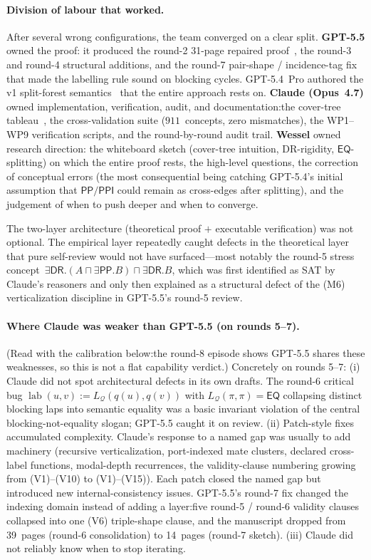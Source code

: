 \documentclass[
]{ceurart}
\theoremstyle{definition}
\newcommand{\DR}{\ensuremath{\mathsf{DR}}}
\newcommand{\EQ}{\ensuremath{\mathsf{EQ}}}
\newcommand{\PP}{\ensuremath{\mathsf{PP}}}
\newcommand{\PPI}{\ensuremath{\mathsf{PPI}}}
\newcommand{\Q}{\ensuremath{\mathcal Q}}
\newcommand{\lab}{\operatorname{lab}}
\begin{document}
\paragraph{Division of labour that worked.}
After several wrong configurations, the team converged on a clear
split.  \textbf{GPT-5.5} owned the proof: it produced the round-2
31-page repaired proof~\cite{GPT55Repaired}, the round-3 and
round-4 structural additions, and the round-7 pair-shape /
incidence-tag fix~\cite{GPT55Round7Sketch} that made the
labelling rule sound on blocking cycles.  GPT-5.4~Pro authored
the v1 split-forest semantics~\cite{SiblingCompleted} that the
entire approach rests on.  \textbf{Claude (Opus~4.7)} owned
implementation, verification, audit, and documentation:\@ the
cover-tree tableau~\cite{CoverTreeImpl}, the cross-validation
suite ($911$~concepts, zero mismatches), the WP1--WP9
verification scripts, and the round-by-round audit trail.
\textbf{Wessel} owned research direction: the whiteboard sketch
(cover-tree intuition, DR-rigidity, $\EQ$-splitting) on which the
entire proof rests, the high-level questions, the correction of
conceptual errors (the most consequential being catching
GPT-5.4's initial assumption that $\PP/\PPI$ could remain as
cross-edges after splitting), and the judgement of when to push
deeper and when to converge.

The two-layer architecture (theoretical proof $+$ executable
verification) was not optional.  The empirical layer repeatedly
caught defects in the theoretical layer that pure self-review
would not have surfaced---most notably the round-5 stress
concept~$\exists\DR.(A\sqcap\exists\PP.B)\sqcap\exists\DR.B$,
which was first identified as SAT by Claude's reasoners and only
then explained as a structural defect of the (M6) verticalization
discipline in GPT-5.5's round-5 review.

\paragraph{Where Claude was weaker than GPT-5.5 (on rounds 5--7).}
(Read with the calibration below:\@ the round-8 episode shows
GPT-5.5 shares these weaknesses, so this is not a flat capability
verdict.)  Concretely on rounds 5--7: (i) Claude did not spot
architectural defects in its own drafts.  The round-6 critical bug
$\lab(u,v):=L_\Q(q(u),q(v))$ with $L_\Q(\pi,\pi)=\EQ$ collapsing
distinct blocking laps into semantic equality was a basic
invariant violation of the central blocking-not-equality slogan;
GPT-5.5 caught it on review.  (ii) Patch-style fixes accumulated
complexity.  Claude's response to a named gap was usually to add
machinery (recursive verticalization, port-indexed mate clusters,
declared cross-label functions, modal-depth recurrences, the
validity-clause numbering growing from (V1)--(V10) to (V1)--(V15)).
Each patch closed the named gap but introduced new
internal-consistency issues.  GPT-5.5's round-7 fix changed the
indexing domain instead of adding a layer:\@ five round-5 /
round-6 validity clauses collapsed into one (V6) triple-shape
clause, and the manuscript dropped from 39~pages (round-6
consolidation) to 14~pages (round-7 sketch).  (iii) Claude did
not reliably know when to stop iterating.
\end{document}
